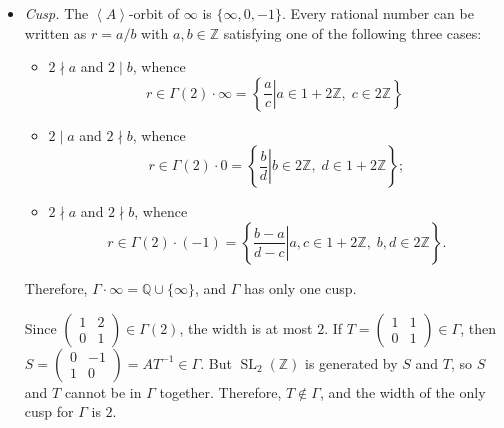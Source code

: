 \documentclass{article}
\theoremstyle{definition}
\theoremstyle{remark}
\newcommand{\Q}{\mathbb{Q}}
\newcommand{\Z}{\mathbb{Z}}
\DeclareMathOperator{\SL}{SL}
\begin{document}
\begin{itemize}
\item \textit{Cusp.}
The $\left<A\right>$-orbit of $\infty$ is $\{\infty, 0, -1\}$.
Every rational number can be written as $r = a/b$ with $a, b\in \Z$ satisfying one of the following three cases:
\begin{itemize}
    \item $2\nmid a$ and $2\mid b$, whence \[r\in \Gamma(2)\cdot \infty = \left\{\left.\frac{a}{c}\right|a\in 1 + 2\Z,\; c\in 2\Z\right\}\;\]
    \item $2\mid a$ and $2\nmid b$, whence \[r\in \Gamma(2)\cdot 0 = \left\{\left.\frac{b}{d}\right|b\in 2\Z,\; d\in 1+2\Z\right\};\]
    \item $2\nmid a$ and $2\nmid b$, whence \[r\in \Gamma(2)\cdot (-1) = \left\{\left.\frac{b-a}{d-c}\right|a, c\in 1 + 2\Z,\; b, d\in 2\Z\right\}.\]
\end{itemize}
Therefore, $\Gamma\cdot \infty = \Q\cup\{\infty\}$, and $\Gamma$ has only one cusp.

Since $\begin{pmatrix}
    1&2\\0&1
\end{pmatrix}\in\Gamma(2)$, the width is at most $2$.
If $T = \begin{pmatrix}
    1&1\\0&1
\end{pmatrix}\in\Gamma$, then $S = \begin{pmatrix}
    0&-1\\1&0
\end{pmatrix}= AT^{-1}\in\Gamma$. But $\SL_2(\Z)$ is generated by $S$ and $T$, so $S$ and $T$ cannot be in $\Gamma$ together. Therefore, $T\notin \Gamma$, and the width of the only cusp for $\Gamma$ is $2$.

\end{itemize}
\end{document}
